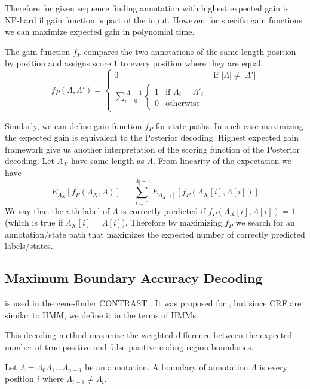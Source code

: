 Therefore for given sequence finding annotation with highest expected gain is
NP-hard if gain function is part of the input. However, for specific gain
functions we can maximize expected gain in polynomial time.

The gain function $f_P$ compares the two annotations of the same length position
by position and assigns score $1$ to every position where they are equal.
\begin{equation}
f_P(\Lambda,\Lambda') = 
\begin{cases}
0 & \text{if $|\Lambda|\not=|\Lambda'|$}\\
\sum_{i=0}^{|\Lambda|-1}\begin{cases}
1 & \text{if $\Lambda_i=\Lambda'_i$}\\
0 & \text{otherwise}
\end{cases}
\end{cases}
\end{equation}

Similarly, we can define gain function $f_P$ for state paths. In such case
maximizing the expected gain is equivalent to the Posterior decoding. Highest
expected gain framework give us another interpretation of the scoring function of
the Posterior decoding. Let $\Lambda_X$  have same length as $\Lambda$. From
linearity of the expectation we have \[E_{\Lambda_X}[f_P(\Lambda_X,\Lambda)] =
\sum_{i=0}^{|\Lambda|-1}E_{\Lambda_X[i]}[f_P(\Lambda_X[i],\Lambda[i])]\] We say
that the $i$-th label of $\Lambda$ is correctly predicted if
$f_P(\Lambda_X[i],\Lambda[i])=1$ (which is true if $\Lambda_X[i]=\Lambda[i]$). Therefore  by maximizing $f_P$ we search for
an annotation/state path that maximizes the expected number of correctly
predicted labels/states.

\subsection{Maximum Boundary Accuracy Decoding}

 is used in the gene-finder
CONTRAST \cite{Gross2007}. It
was proposed for , but since CRF
are similar to HMM, we define it in the terms of HMMs.

This decoding method  maximize the weighted difference between the expected
number of true-positive and false-positive coding region boundaries.

\begin{definition}
Let $\Lambda=\Lambda_0\Lambda_1\dots\Lambda_{n-1}$ be an annotation. A boundary of
annotation $\Lambda$ is every position $i$ where $\Lambda_{i-1}\not=\Lambda_i$. 
\end{definition}

